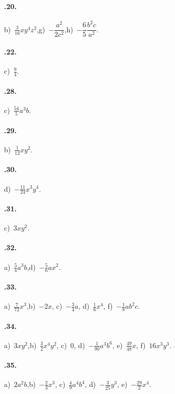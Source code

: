 \paragraph{\thechapter.20.} b)~$\frac{3}{16}xy^{4}z^{2}$,\quad g)~$-\dfrac{a^2}{2c^2}$,\quad h)~$-\dfrac{6}{5}\dfrac{b^2c}{a^2}$.
\begin{multicols}{3}
\paragraph{\thechapter.22.} c)~$\frac{9}{4}$.
\paragraph{\thechapter.28.} c)~$\frac{54}{5}a^{3}b$.
\paragraph{\thechapter.29.} b)~$\frac{1}{12}xy^{2}$.
\paragraph{\thechapter.30.} d)~$-\frac{11}{24}x^{3}y^{4}$.
\paragraph{\thechapter.31.} c)~$3xy^{2}$.
\paragraph{\thechapter.32.} a)~$\frac{5}{4}a^{3}b$,\quad d)~$-\frac{5}{6}ax^{2}$.
\end{multicols}
\paragraph{\thechapter.33.} a)~$\frac{7}{72}x^{3}$,\quad b)~$-2x$, \quad c)~$-\frac{3}{4}a$, \quad d)~$\frac{1}{6}x^{4}$, \quad f)~$-\frac{1}{8}ab^{2}c$.
\paragraph{\thechapter.34.} a)~$3xy^{2}$,\quad b)~$\frac{3}{2}x^{4}y^{2}$, \quad c)~0, \quad d)~$-\frac{1}{90}a^{3}b^{6}$, \quad e)~$\frac{49}{48}x$, \quad f)~$16x^{3}y^{3}$.
\paragraph{\thechapter.35.} a)~$2a^{2}b$,\quad b)~$-\frac{2}{3}x^{3}$, \quad c)~$\frac{4}{9}a^{4}b^{4}$, \quad d)~$-\frac{3}{25}y^{3}$, \quad e)~$-\frac{29}{2}x^{4}$.

